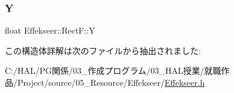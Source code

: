 \mbox{\label{struct_effekseer_1_1_rect_f_ac019b5783fec33a61954817f04ead8f0}} 
\subsubsection{\texorpdfstring{Y}{Y}}
{\footnotesize\ttfamily float Effekseer\+::\+Rect\+F\+::Y}



この構造体詳解は次のファイルから抽出されました\+:\begin{DoxyCompactItemize}
\item 
C\+:/\+H\+A\+L/\+P\+G関係/03\+\_\+作成プログラム/03\+\_\+\+H\+A\+L授業/就職作品/\+Project/source/05\+\_\+\+Resource/\+Effekseer/\mbox{\hyperlink{_effekseer_8h}{Effekseer.\+h}}\end{DoxyCompactItemize}
